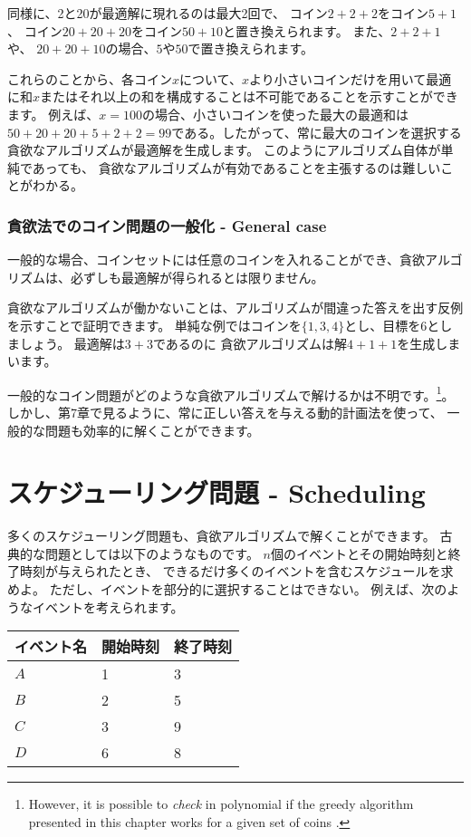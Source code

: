 同様に、2と20が最適解に現れるのは最大2回で、
コイン$2+2+2$をコイン$5+1$、
コイン$20+20+20$をコイン$50+10$と置き換えられます。
また、$2+2+1$ や、 $20+20+10$の場合、$5$や$50$で置き換えられます。

これらのことから、各コイン$x$について、$x$より小さいコインだけを用いて最適に和$x$またはそれ以上の和を構成することは不可能であることを示すことができます。
例えば、$x = 100$の場合、小さいコインを使った最大の最適和は$50+20+20+5+2+2 = 99$である。したがって、常に最大のコインを選択する貪欲なアルゴリズムが最適解を生成します。
このようにアルゴリズム自体が単純であっても、
貪欲なアルゴリズムが有効であることを主張するのは難しいことがわかる。

\subsubsection{貪欲法でのコイン問題の一般化 - General case}

一般的な場合、コインセットには任意のコインを入れることができ、貪欲アルゴリズムは、必ずしも最適解が得られるとは限りません。

貪欲なアルゴリズムが働かないことは、アルゴリズムが間違った答えを出す反例を示すことで証明できます。
単純な例ではコインを$\{1,3,4\}$とし、目標を6としましょう。
最適解は$3 + 3$であるのに
貪欲アルゴリズムは解$4 + 1 + 1$を生成しまいます。

一般的なコイン問題がどのような貪欲アルゴリズムで解けるかは不明です。\footnote{However, it is possible
to \emph{check} in polynomial 
if the greedy algorithm presented in this chapter works for
a given set of coins \cite{pea05}.}。
しかし、第7章で見るように、常に正しい答えを与える動的計画法を使って、
一般的な問題も効率的に解くことができます。

\section{スケジューリング問題 - Scheduling}

多くのスケジューリング問題も、貪欲アルゴリズムで解くことができます。
古典的な問題としては以下のようなものです。
$n$個のイベントとその開始時刻と終了時刻が与えられたとき、
できるだけ多くのイベントを含むスケジュールを求めよ。
ただし、イベントを部分的に選択することはできない。
例えば、次のようなイベントを考えられます。

\begin{center}
\begin{tabular}{lll}
イベント名 & 開始時刻 & 終了時刻 \\
\hline
$A$ & 1 & 3 \\
$B$ & 2 & 5 \\
$C$ & 3 & 9 \\
$D$ & 6 & 8 \\
\end{tabular}
\end{center}


